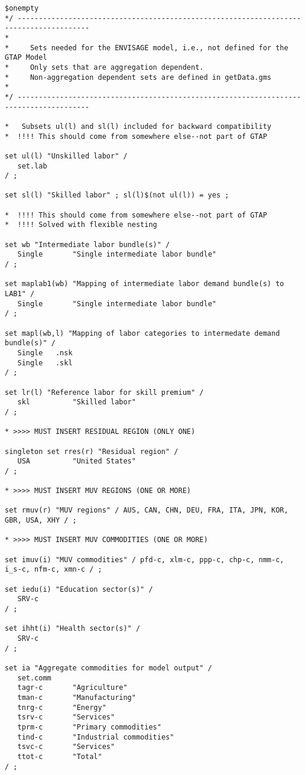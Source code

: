 \begin{lstlisting}[language=GAMS, caption={Example 'Sets' file for the \textsc{Envisage} model}, label=lst:SetsFileExample]
$onempty
*/ ---------------------------------------------------------------------------------------
*
*     Sets needed for the ENVISAGE model, i.e., not defined for the GTAP Model
*     Only sets that are aggregation dependent.
*     Non-aggregation dependent sets are defined in getData.gms
*
*/ ---------------------------------------------------------------------------------------

*   Subsets ul(l) and sl(l) included for backward compatibility
*  !!!! This should come from somewhere else--not part of GTAP

set ul(l) "Unskilled labor" /
   set.lab
/ ;

set sl(l) "Skilled labor" ; sl(l)$(not ul(l)) = yes ;

*  !!!! This should come from somewhere else--not part of GTAP
*  !!!! Solved with flexible nesting

set wb "Intermediate labor bundle(s)" /
   Single       "Single intermediate labor bundle"
/ ;

set maplab1(wb) "Mapping of intermediate labor demand bundle(s) to LAB1" /
   Single       "Single intermediate labor bundle"
/ ;

set mapl(wb,l) "Mapping of labor categories to intermedate demand bundle(s)" /
   Single   .nsk
   Single   .skl
/ ;

set lr(l) "Reference labor for skill premium" /
   skl          "Skilled labor"
/ ;

* >>>> MUST INSERT RESIDUAL REGION (ONLY ONE)

singleton set rres(r) "Residual region" /
   USA          "United States"
/ ;

* >>>> MUST INSERT MUV REGIONS (ONE OR MORE)

set rmuv(r) "MUV regions" / AUS, CAN, CHN, DEU, FRA, ITA, JPN, KOR, GBR, USA, XHY / ;

* >>>> MUST INSERT MUV COMMODITIES (ONE OR MORE)

set imuv(i) "MUV commodities" / pfd-c, xlm-c, ppp-c, chp-c, nmm-c, i_s-c, nfm-c, xmn-c / ;

set iedu(i) "Education sector(s)" /
   SRV-c
/ ;

set ihht(i) "Health sector(s)" /
   SRV-c
/ ;

set ia "Aggregate commodities for model output" /
   set.comm
   tagr-c       "Agriculture"
   tman-c       "Manufacturing"
   tnrg-c       "Energy"
   tsrv-c       "Services"
   tprm-c       "Primary commodities"
   tind-c       "Industrial commodities"
   tsvc-c       "Services"
   ttot-c       "Total"
/ ;


\end{lstlisting}
